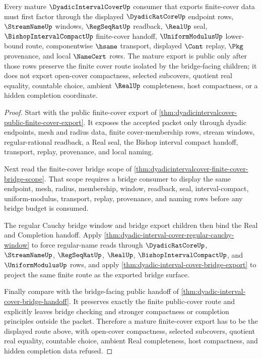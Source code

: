 \begin{theorem}
\label{thm:dyadic-interval-cover-mature-finite-cover-export}
Every mature $\DyadicIntervalCoverUp$ consumer that exports finite-cover data must first factor through the displayed $\DyadicRatCoreUp$ endpoint rows, $\StreamNameUp$ windows, $\RegSeqRatUp$ readback, $\RealUp$ seal, $\BishopIntervalCompactUp$ finite-cover handoff, $\UniformModulusUp$ lower-bound route, componentwise $\hsame$ transport, displayed $\Cont$ replay, $\Pkg$ provenance, and local $\NameCert$ rows. The mature export is public only after those rows preserve the finite cover route isolated by the bridge-facing children; it does not export open-cover compactness, selected subcovers, quotient real equality, countable choice, ambient $\RealUp$ completeness, host compactness, or a hidden completion coordinate.
\end{theorem}
\begin{proof}
Start with the public finite-cover export of \autoref{thm:dyadicintervalcover-public-finite-cover-export}. It exposes the accepted packet only through dyadic endpoints, mesh and radius data, finite cover-membership rows, stream windows, regular-rational readback, a Real seal, the Bishop interval compact handoff, transport, replay, provenance, and local naming.

Next read the finite-cover bridge scope of \autoref{thm:dyadicintervalcover-finite-cover-bridge-scope}. That scope requires a bridge consumer to display the same endpoint, mesh, radius, membership, window, readback, seal, interval-compact, uniform-modulus, transport, replay, provenance, and naming rows before any bridge budget is consumed.

The regular Cauchy bridge window and bridge export children then bind the Real and Completion handoff. Apply \autoref{thm:dyadic-interval-cover-regular-cauchy-window} to force regular-name reads through $\DyadicRatCoreUp$, $\StreamNameUp$, $\RegSeqRatUp$, $\RealUp$, $\BishopIntervalCompactUp$, and $\UniformModulusUp$ rows, and apply \autoref{thm:dyadic-interval-cover-bridge-export} to project the same finite route as the exported bridge surface.

Finally compare with the bridge-facing public handoff of \autoref{thm:dyadic-interval-cover-bridge-handoff}. It preserves exactly the finite public-cover route and explicitly leaves bridge checking and stronger compactness or completion principles outside the packet. Therefore a mature finite-cover export has to be the displayed route above, with open-cover compactness, selected subcovers, quotient real equality, countable choice, ambient Real completeness, host compactness, and hidden completion data refused.
\end{proof}

